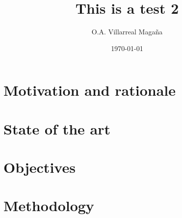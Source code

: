 \documentclass[a4paper]{article}
\title{This is a test 2}
\author{O.A. Villarreal Maga\~na}
\date{\today}
\begin{document}
\maketitle
\thispagestyle{empty}
\setcounter{page}{1}


\thispagestyle{empty} 
\thispagestyle{empty}




 
 
%

%



\section{Motivation and rationale}
 

\section{State of the art}
 

\section{Objectives}
 

\section{Methodology}
 
\end{document}
